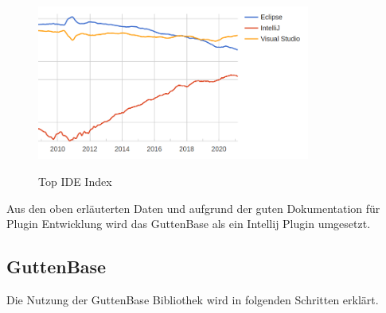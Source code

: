 	\begin{figure}[H]
		\caption{Top IDE Index}
		\centering
		\includegraphics[width=0.8\textwidth]{images/ide-index}
		\label{img:ide-index}
	\end{figure}
	Aus den oben erläuterten Daten und aufgrund der guten Dokumentation für Plugin Entwicklung wird das GuttenBase als ein Intellij Plugin umgesetzt. 
	
	
	\subsection{GuttenBase}
	\label{sec:imp:gb}
	Die Nutzung der GuttenBase Bibliothek wird in folgenden Schritten erklärt.
